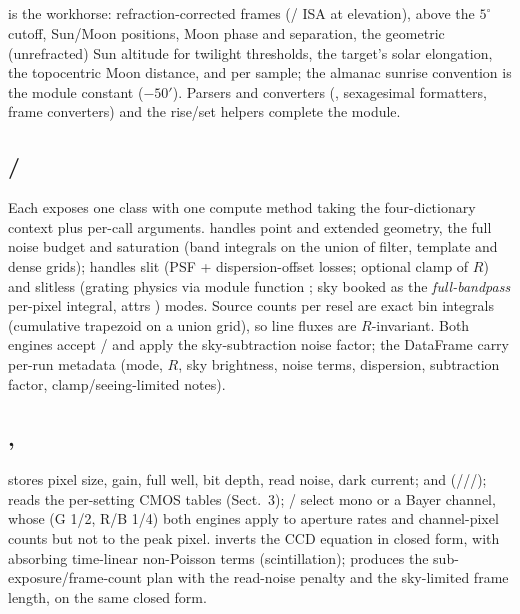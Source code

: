 \subsection{}
 is the workhorse: refraction-corrected
 frames (/
ISA at elevation),  above the $5^\circ$ cutoff,
Sun/Moon positions, Moon phase and separation, the geometric
(unrefracted) Sun altitude for twilight thresholds, the target's solar
elongation, the topocentric Moon distance, and
 per sample; the almanac sunrise
convention is the module constant 
($-50'$). Parsers and converters
(, sexagesimal formatters, frame converters) and the
 rise/set helpers complete the module.

\subsection{ / }
Each exposes one class with one compute method taking the four-dictionary
context plus per-call arguments. 
handles point and extended geometry, the full noise budget and saturation
(band integrals on the union of filter, template and dense grids);
 handles slit (PSF +
dispersion-offset losses; optional  clamp of $R$)
and slitless (grating physics via module function
; sky booked as the
\emph{full-bandpass} per-pixel integral, attrs
) modes. Source counts per resel are
exact bin integrals (cumulative trapezoid on a union grid), so line
fluxes are $R$-invariant. Both engines accept
/ and apply the sky-subtraction
noise factor; the DataFrame  carry per-run metadata (mode,
$R$, sky brightness, noise terms, dispersion, subtraction factor,
clamp/seeing-limited notes).

\subsection{, }
 stores pixel size, gain, full well, bit depth, read noise,
dark current;  and 
(///);
 reads the per-setting CMOS tables (Sect.~3);
/ select mono or a Bayer channel,
whose  (G 1/2, R/B 1/4) both engines apply
to aperture rates and channel-pixel counts but not to the peak pixel.
 inverts the CCD equation in closed
form, with  absorbing time-linear
non-Poisson terms (scintillation);  produces the
sub-exposure/frame-count plan with the read-noise penalty and the
sky-limited frame length, on the same closed form.

